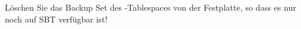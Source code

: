     \item L\"oschen Sie das Backup Set des -Tablespaces von der Festplatte, so dass es nur noch auf SBT verf\"ugbar ist!
